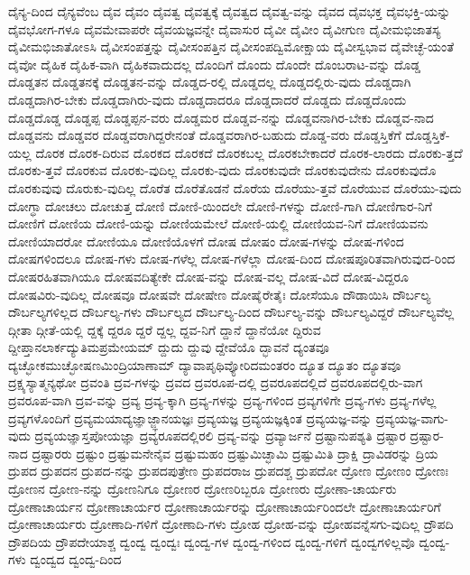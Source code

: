 {ದೈನ್ಯ-ದಿಂದ
ದೈನ್ಯವೆಂಬ
ದೈವ
ದೈವಂ
ದೈವತ್ವ
ದೈವತ್ವಕ್ಕೆ
ದೈವತ್ವದ
ದೈವತ್ವ-ವನ್ನು
ದೈವದ
ದೈವಭಕ್ತ
ದೈವಭಕ್ತಿ-ಯನ್ನು
ದೈವಭೋಗ-ಗಳೂ
ದೈವಮೇವಾಪರೇ
ದೈವಯಜ್ಞವನ್ನೇ
ದೈವಾಸುರ
ದೈವೀ
ದೈವೀಂ
ದೈವೀಗುಣ
ದೈವೀಮಭಿಜಾತಸ್ಯ
ದೈವೀಮಭಿಜಾತೋಽಸಿ
ದೈವೀಸಂಪತ್ತನ್ನು
ದೈವೀಸಂಪತ್ತಿನ
ದೈವೀಸಂಪದ್ವಿಮೋಕ್ಷಾಯ
ದೈವೀಸ್ವಭಾವ
ದೈವೇಚ್ಛೆ-ಯಂತೆ
ದೈವೋ
ದೈಹಿಕ
ದೈಹಿಕ-ವಾಗಿ
ದೈಹಿಕವಾದುದಲ್ಲ
ದೊಂದಿಗೆ
ದೊಂದು
ದೊಂದೇ
ದೊಂಬರಾಟ-ವನ್ನು
ದೊಡ್ಡ
ದೊಡ್ಡತನ
ದೊಡ್ಡತನಕ್ಕೆ
ದೊಡ್ಡತನ-ವನ್ನು
ದೊಡ್ಡದ-ರಲ್ಲಿ
ದೊಡ್ಡದಲ್ಲ
ದೊಡ್ಡದಲ್ಲಿರು-ವುದು
ದೊಡ್ಡದಾಗಿ
ದೊಡ್ಡದಾಗಿರ-ಬೇಕು
ದೊಡ್ಡದಾಗಿರು-ವುದು
ದೊಡ್ಡದಾದರೂ
ದೊಡ್ಡದಾದರೆ
ದೊಡ್ಡದು
ದೊಡ್ಡದೊಂದು
ದೊಡ್ಡದೊಡ್ಡ
ದೊಡ್ಡಪ್ಪ
ದೊಡ್ಡಪ್ಪನ-ವರು
ದೊಡ್ಡಮರ
ದೊಡ್ಡವ-ನನ್ನು
ದೊಡ್ಡವನಾಗಿರ-ಬೇಕು
ದೊಡ್ಡವ-ನಾದ
ದೊಡ್ಡವನು
ದೊಡ್ಡವರ
ದೊಡ್ಡವರಾಗಿದ್ದರೇನಂತೆ
ದೊಡ್ಡವರಾಗಿರ-ಬಹುದು
ದೊಡ್ಡ-ವರು
ದೊಡ್ಡಸ್ತಿಕೆಗೆ
ದೊಡ್ಡಸ್ತಿಕೆ-ಯಲ್ಲ
ದೊರಕ
ದೊರಕ-ದಿರುವ
ದೊರಕದ
ದೊರಕದೆ
ದೊರಕಬಲ್ಲ
ದೊರಕಬೇಕಾದರೆ
ದೊರಕ-ಲಾರದು
ದೊರಕು-ತ್ತದೆ
ದೊರಕು-ತ್ತವೆ
ದೊರಕುವ
ದೊರಕು-ವುದಿಲ್ಲ
ದೊರಕು-ವುದು
ದೊರಕುವುದೇ
ದೊರಕುವುದೇನು
ದೊರಕುವುದೊ
ದೊರಕುವುವು
ದೊರುಕು-ವುದಿಲ್ಲ
ದೊರೆತ
ದೊರೆತೊಡನೆ
ದೊರೆಯ
ದೊರೆಯು-ತ್ತವೆ
ದೊರೆಯುವ
ದೊರೆಯು-ವುದು
ದೋಗ್ಧಾ
ದೋಚಲು
ದೋಚುತ್ತ
ದೋಣಿ
ದೋಣಿ-ಯಿಂದಲೇ
ದೋಣಿ-ಗಳನ್ನು
ದೋಣಿ-ಗಾಗಿ
ದೋಣಿಗಾರ-ನಿಗೆ
ದೋಣಿಗೆ
ದೋಣಿಯ
ದೋಣಿ-ಯನ್ನು
ದೋಣಿಯಮೇಲೆ
ದೋಣಿ-ಯಲ್ಲಿ
ದೋಣಿಯವ-ನಿಗೆ
ದೋಣಿಯವನು
ದೋಣಿಯಾದರೋ
ದೋಣಿಯೂ
ದೋಣಿಯೊಳಗೆ
ದೋಷ
ದೋಷಂ
ದೋಷ-ಗಳನ್ನು
ದೋಷ-ಗಳಿಂದ
ದೋಷಗಳಿಂದಲೂ
ದೋಷ-ಗಳು
ದೋಷ-ಗಳೆಲ್ಲ
ದೋಷ-ಗಳೆಲ್ಲಾ
ದೋಷ-ದಿಂದ
ದೋಷಪೂರಿತವಾಗಿರುವುದ-ರಿಂದ
ದೋಷರಹಿತವಾಗಿಯೂ
ದೋಷವದಿತ್ಯೇಕೇ
ದೋಷ-ವನ್ನು
ದೋಷ-ವಲ್ಲ
ದೋಷ-ವಿದೆ
ದೋಷ-ವಿದ್ದರೂ
ದೋಷವಿರು-ವುದಿಲ್ಲ
ದೋಷವೂ
ದೋಷವೇ
ದೋಷೇಣ
ದೋಷೈರೇತೈಃ
ದೋಸೆಯೂ
ದೌಡಾಯಿಸಿ
ದೌರ್ಬಲ್ಯ
ದೌರ್ಬಲ್ಯಗಳಿಲ್ಲದ
ದೌರ್ಬಲ್ಯ-ಗಳು
ದೌರ್ಬಲ್ಯದ
ದೌರ್ಬಲ್ಯ-ದಿಂದ
ದೌರ್ಬಲ್ಯ-ವನ್ನು
ದೌರ್ಬಲ್ಯವಿದ್ದರೆ
ದೌರ್ಬಲ್ಯವೆಲ್ಲ
ದ್ಗೀತಾ
ದ್ಗೀತೆ-ಯಲ್ಲಿ
ದ್ದಕ್ಕೆ
ದ್ದರೂ
ದ್ದರೆ
ದ್ದಲ್ಲ
ದ್ದವ-ನಿಗೆ
ದ್ದಾನೆ
ದ್ದಾನೆಯೋ
ದ್ದಿರುವ
ದ್ದೀಪ್ತಾನಲಾರ್ಕದ್ಯುತಿಮಪ್ರಮೇಯಮ್
ದ್ದುದು
ದ್ದುವು
ದ್ದೇವೆಯೊ
ದ್ಭಾವನೆ
ದ್ಯಂತವೂ
ದ್ಯಚ್ಛೋಕಮುಚ್ಛೋಷಣಮಿಂದ್ರಿಯಾಣಾಮ್
ದ್ಯಾವಾಪೃಥಿವ್ಯೋರಿದಮಂತರಂ
ದ್ಯೂತ
ದ್ಯೂತಂ
ದ್ಯೂತವೂ
ದ್ರಕ್ಷ್ಯಸ್ಯಾತ್ಮನ್ಯಥೋ
ದ್ರವಂತಿ
ದ್ರವ-ಗಳನ್ನು
ದ್ರವದ
ದ್ರವರೂಪ-ದಲ್ಲಿ
ದ್ರವರೂಪದಲ್ಲಿದೆ
ದ್ರವರೂಪದಲ್ಲಿರು-ವಾಗ
ದ್ರವರೂಪ-ವಾಗಿ
ದ್ರವ-ವನ್ನು
ದ್ರವ್ಯ
ದ್ರವ್ಯ-ಕ್ಕಾಗಿ
ದ್ರವ್ಯ-ಗಳನ್ನು
ದ್ರವ್ಯ-ಗಳಿಂದ
ದ್ರವ್ಯಗಳಿಗೇ
ದ್ರವ್ಯ-ಗಳು
ದ್ರವ್ಯ-ಗಳೆಲ್ಲ
ದ್ರವ್ಯಗಳೊಂದಿಗೆ
ದ್ರವ್ಯಮಯಾದ್ಯಜ್ಞಾಜ್ಜ್ಞಾನಯಜ್ಞಃ
ದ್ರವ್ಯಯಜ್ಞ
ದ್ರವ್ಯಯಜ್ಞಕ್ಕಿಂತ
ದ್ರವ್ಯಯಜ್ಞ-ವನ್ನು
ದ್ರವ್ಯಯಜ್ಞ-ವಾಗು-ವುದು
ದ್ರವ್ಯಯಜ್ಞಾಸ್ತಪೋಯಜ್ಞಾ
ದ್ರವ್ಯರೂಪದಲ್ಲಿರಲಿ
ದ್ರವ್ಯ-ವನ್ನು
ದ್ರವ್ಯಾರ್ಜನೆ
ದ್ರಷ್ಟಾನುಪಶ್ಯತಿ
ದ್ರಷ್ಟಾರ
ದ್ರಷ್ಟಾರ-ನಾದ
ದ್ರಷ್ಟಾರರು
ದ್ರಷ್ಟುಂ
ದ್ರಷ್ಟುಮನೇನೈವ
ದ್ರಷ್ಟುಮಹಂ
ದ್ರಷ್ಟುಮಿಚ್ಛಾಮಿ
ದ್ರಷ್ಟುಮಿತಿ
ದ್ರಾಕ್ಷಿ
ದ್ರಾವಿಡರನ್ನು
ದ್ರಿಯ
ದ್ರುಪದ
ದ್ರುಪದನ
ದ್ರುಪದ-ನನ್ನು
ದ್ರುಪದಪುತ್ರೇಣ
ದ್ರುಪದರಾಜ
ದ್ರುಪದಶ್ಚ
ದ್ರುಪದೋ
ದ್ರೋಣ
ದ್ರೋಣಂ
ದ್ರೋಣಃ
ದ್ರೋಣನ
ದ್ರೋಣ-ನನ್ನು
ದ್ರೋಣನಿಗೂ
ದ್ರೋಣರ
ದ್ರೋಣರಿಬ್ಬರೂ
ದ್ರೋಣರು
ದ್ರೋಣಾ-ಚಾರ್ಯರು
ದ್ರೋಣಾಚಾರ್ಯನ
ದ್ರೋಣಾಚಾರ್ಯರ
ದ್ರೋಣಾಚಾರ್ಯರನ್ನು
ದ್ರೋಣಾಚಾರ್ಯರಿಂದಲೇ
ದ್ರೋಣಾಚಾರ್ಯರಿಗೆ
ದ್ರೋಣಾಚಾರ್ಯರು
ದ್ರೋಣಾದಿ-ಗಳಿಗೆ
ದ್ರೋಣಾದಿ-ಗಳು
ದ್ರೋಹ
ದ್ರೋಹ-ವನ್ನು
ದ್ರೋಹವನ್ನೆಸಗು-ವುದಿಲ್ಲ
ದ್ರೌಪದಿ
ದ್ರೌಪದಿಯ
ದ್ರೌಪದೇಯಾಶ್ಚ
ದ್ವಂದ್ವ
ದ್ವಂದ್ವಃ
ದ್ವಂದ್ವ-ಗಳ
ದ್ವಂದ್ವ-ಗಳಿಂದ
ದ್ವಂದ್ವ-ಗಳಿಗೆ
ದ್ವಂದ್ವಗಳಿಲ್ಲವೊ
ದ್ವಂದ್ವ-ಗಳು
ದ್ವಂದ್ವದ
ದ್ವಂದ್ವ-ದಿಂದ
}
